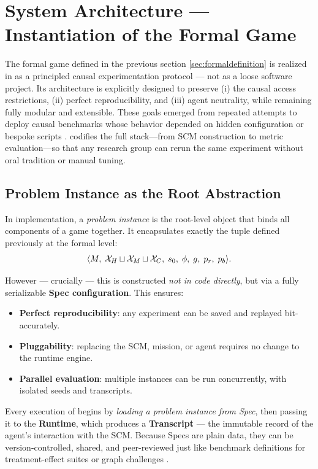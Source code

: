\section{System Architecture — Instantiation of the Formal Game}

The formal game defined in the previous section \ref{sec:formaldefinition} is realized in \package as a principled causal experimentation protocol — not as a loose software project.  
Its architecture is explicitly designed to preserve (i) the causal access restrictions, (ii) perfect reproducibility, and (iii) agent neutrality, while remaining fully modular and extensible.
These goals emerged from repeated attempts to deploy causal benchmarks whose behavior depended on hidden configuration or bespoke scripts \citep{RealCause2021,EvaluationFramework2022}. \package codifies the full stack—from SCM construction to metric evaluation—so that any research group can rerun the same experiment without oral tradition or manual tuning.

\subsection{Problem Instance as the Root Abstraction}
In implementation, a \emph{problem instance} is the root-level object that binds all components of a game together.  
It encapsulates exactly the tuple defined previously at the formal level:
\[
    \langle 
        M,\;\mathcal{X}_H \sqcup \mathcal{X}_M \sqcup \mathcal{X}_C,\;
        s_0,\; \phi,\;
        g,\; p_r,\; p_b
    \rangle.
\]

However — crucially — this is constructed \emph{not in code directly}, but via a fully serializable \textbf{Spec configuration}.  
This ensures:

\begin{itemize}
    \item \textbf{Perfect reproducibility}: any experiment can be saved and replayed bit-accurately.
    \item \textbf{Pluggability}: replacing the SCM, mission, or agent requires no change to the runtime engine.
    \item \textbf{Parallel evaluation}: multiple instances can be run concurrently, with isolated seeds and transcripts.
\end{itemize}

\noindent
Every execution of \game begins by \emph{loading a problem instance from Spec}, then passing it to the \textbf{Runtime}, which produces a \textbf{Transcript} — the immutable record of the agent’s interaction with the SCM.
Because Specs are plain data, they can be version-controlled, shared, and peer-reviewed just like benchmark definitions for treatment-effect suites or graph challenges \citep{CauseBox2021,CausalBench2024}.

